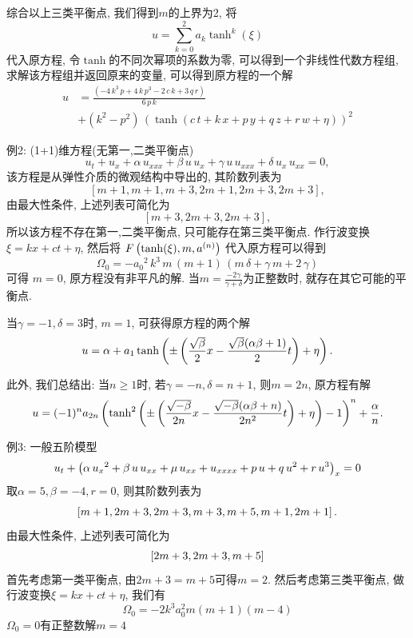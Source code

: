 \begin{frame}
综合以上三类平衡点, 我们得到$m$的上界为2, 将
\[
    u=\sum_{k=0}^2{a_k\tanh^k(\xi)}
\]
代入原方程, 令$\tanh$的不同次幂项的系数为零, 可以得到一个非线性代数方程组, 求解该方程组并返回原来的变量, 可以得到原方程的一个解
\begin{equation*}
\begin{aligned}
    u&=\frac{\left( -4\,{k}^{3}\,p+4\,k\,{p}^{3}-2\,c\,k+3\,q\,r\right) }{6\,p\,k} \\ 
    &+\left( {k}^{2}-{p}^{2}\right) \,\left( \tanh\left( c\,t+k\,x+p\,y+q\,z+r\,w+\eta\right) \right) ^{2}
\end{aligned}
\end{equation*}
\end{frame}

\begin{frame}{例2: (1+1)维方程(无第一,二类平衡点)}
\begin{equation*}
    {{u}_{t}}+{{u}_{x}}+\alpha\,{{u}_{xxx}}+\beta\,u\,{{u}_{x}}+\gamma\,u\,{{u}_{xxx}}+\delta\,{{u}_{x}}\,{{u}_{xx}}=0,
\end{equation*}
该方程是从弹性介质的微观结构中导出的, 其阶数列表为
\[
    [m+1,m+1,m+3,2m+1,2m+3,2m+3],
\]
由最大性条件, 上述列表可简化为 
\[
    [m+3,2m+3,2m+3], 
\]
所以该方程不存在第一,二类平衡点, 只可能存在第三类平衡点.  作行波变换$\xi=kx+ct+\eta$, 然后将 $F\left(\tanh(\xi),m,a^{(n)}\right)$ 代入原方程可以得到 
\begin{equation*}
    \Omega_0=-{{{a}_{0}}}^{2}\,{k}^{3}\,m\,\left( m+1\right) \,\left( m\,\delta+\gamma\,m+2\,\gamma\right)
\end{equation*}
可得 $m=0$, 原方程没有非平凡的解. 当$m=\frac{-2 \gamma}{\gamma+\delta}$为正整数时, 就存在其它可能的平衡点.
\end{frame}

\begin{frame}
当$\gamma=-1,\delta=3$时, $m=1$, 可获得原方程的两个解 
\[
    u=\alpha+a_1\tanh\left(\pm\left(\frac{\sqrt{\beta}}{2}x-\frac{\sqrt{\beta}(\alpha \beta+1)}{2}t\right)+\eta\right). 
\]

此外, 我们总结出: 当$n\ge 1$时, 若$\gamma=-n,\delta=n+1$, 则$m=2n$, 原方程有解 
\begin{equation*}
u=(-1)^n a_{2n} \left(\tanh^2\left(\pm\left(\frac{\sqrt{-\beta}}{2n}x-\frac{\sqrt{-\beta}(\alpha\beta+n)}{2n^2}t\right)+\eta\right)-1\right)^n+\frac{\alpha}{n} .
\end{equation*}
\end{frame}

\begin{frame}{例3: 一般五阶模型}
\[
    u_t+\left(\alpha\,{{{u}_{x}}}^{2}+\beta\,u\,{{u}_{xx}}+\mu\,{{u}_{xx}}+{{u}_{xxxx}}+p\,u+q\,{u}^{2}+r\,{u}^{3} \right)_x = 0
\]
取$\alpha=5,\beta=-4,r=0$, 则其阶数列表为 
\[
    \left[m+1,2m+3,2m+3,m+3,m+5,m+1,2m+1\right] .
\]
由最大性条件, 上述列表可简化为 
\[
    \left[2m+3,2m+3,m+5\right]
\]
首先考虑第一类平衡点, 由$2m+3=m+5$可得$m=2$.
然后考虑第三类平衡点, 做行波变换$\xi=kx+ct+\eta$, 我们有 
\[
    \Omega_0 = -2k^3a_0^2m(m+1)(m-4) 
\]
$\Omega_0=0$有正整数解$m=4$
\end{frame}

